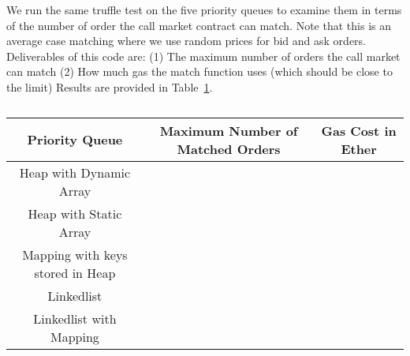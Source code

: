  We run the same truffle test on the five priority queues to examine them in terms of the number of order the call market contract can match.
 Note that this is an average case matching where we use random prices for bid and ask orders.
 Deliverables of this code are: (1) The maximum number of orders the call market can match (2) How much gas the match function uses (which should be close to the limit)
Results are provided in Table~\ref{tab:normal_case_matching}.


\begin{table}[t]
\centering
\begin{tabular}{|c|c|c|}
\hline
\textbf{Priority Queue} & \textbf{Maximum Number of Matched Orders} & \textbf{Gas Cost in Ether}  \\ \hline
 
Heap with Dynamic Array &  &  \\ \hline
Heap with Static Array &  &  \\ \hline
Mapping with keys stored in Heap &  &  \\ \hline
Linkedlist &  &  \\ \hline
Linkedlist with Mapping && \\ \hline

\end{tabular}
\caption{\footnotesize{}\label{tab:normal_case_matching}}
\end{table}























